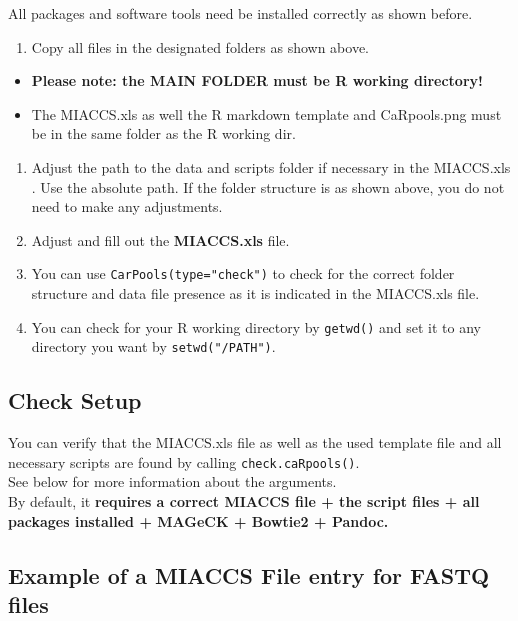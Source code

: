 \documentclass[]{article}
\providecommand{\tightlist}{%
  \setlength{\itemsep}{0pt}\setlength{\parskip}{0pt}}
\begin{document}
All packages and software tools need be installed correctly as shown
before.

\begin{enumerate}
\def\labelenumi{\arabic{enumi}.}
\tightlist
\item
  Copy all files in the designated folders as shown above.
\end{enumerate}

\begin{itemize}
\tightlist
\item
  \textbf{Please note: the MAIN FOLDER must be R working directory!}
\item
  The MIACCS.xls as well the R markdown template and CaRpools.png must
  be in the same folder as the R working dir.
\end{itemize}

\begin{enumerate}
\def\labelenumi{\arabic{enumi}.}
\setcounter{enumi}{1}
\tightlist
\item
  Adjust the path to the data and scripts folder if necessary in the
  MIACCS.xls . Use the absolute path. If the folder structure is as
  shown above, you do not need to make any adjustments.
\item
  Adjust and fill out the \textbf{MIACCS.xls} file.
\item
  You can use \texttt{CarPools(type="check")} to check for the correct
  folder structure and data file presence as it is indicated in the
  MIACCS.xls file.
\item
  You can check for your R working directory by \texttt{getwd()} and set
  it to any directory you want by \texttt{setwd("/PATH")}.
\end{enumerate}

\subsection{Check Setup}\label{check-setup}

You can verify that the MIACCS.xls file as well as the used template
file and all necessary scripts are found by calling
\texttt{check.caRpools()}.\\
See below for more information about the arguments.\\
By default, it \textbf{requires a correct MIACCS file + the script files
+ all packages installed + MAGeCK + Bowtie2 + Pandoc.}

\subsection{Example of a MIACCS File entry for FASTQ
files}\label{example-of-a-miaccs-file-entry-for-fastq-files}
\end{document}
